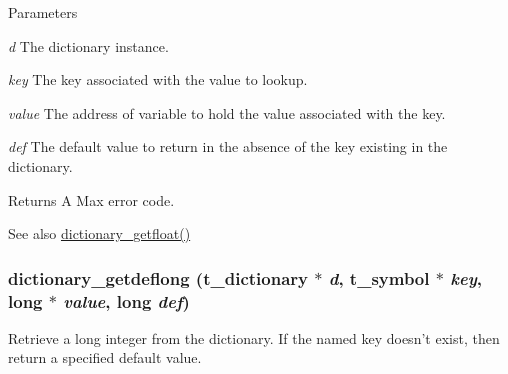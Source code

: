 \begin{DoxyParams}{Parameters}
\item[{\em d}]The dictionary instance. \item[{\em key}]The key associated with the value to lookup. \item[{\em value}]The address of variable to hold the value associated with the key. \item[{\em def}]The default value to return in the absence of the key existing in the dictionary. \end{DoxyParams}
\begin{DoxyReturn}{Returns}
A Max error code.
\end{DoxyReturn}
\begin{DoxySeeAlso}{See also}
\hyperlink{group__dictionary_ga4e166c9edc4575ec89f176455a134cda}{dictionary\_\-getfloat()} 
\end{DoxySeeAlso}
\hypertarget{group__dictionary_ga7beaedd2dbbc352539ccd104db7094b1}{
\subsubsection[{dictionary\_\-getdeflong}]{ dictionary\_\-getdeflong ({\bf t\_\-dictionary} $\ast$ {\em d}, \/  {\bf t\_\-symbol} $\ast$ {\em key}, \/  long $\ast$ {\em value}, \/  long {\em def})}}
\label{group__dictionary_ga7beaedd2dbbc352539ccd104db7094b1}


Retrieve a long integer from the dictionary. If the named key doesn't exist, then return a specified default value.


